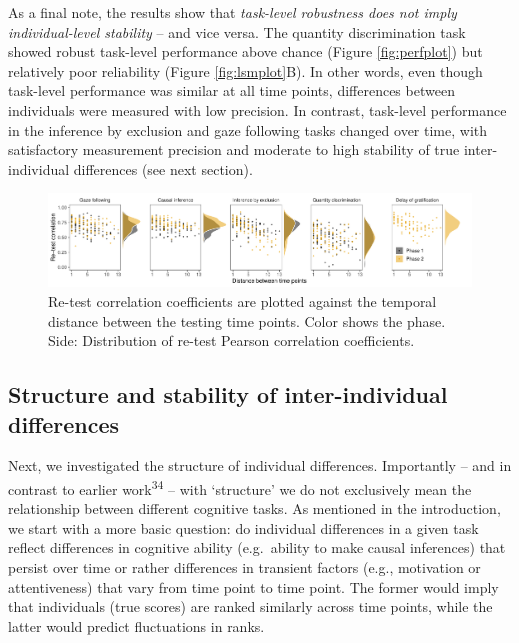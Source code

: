 \documentclass[
  man,floatsintext]{apa6}
\begin{document}
As a final note, the results show that \emph{task-level robustness does not imply individual-level stability} -- and vice versa. The quantity discrimination task showed robust task-level performance above chance (Figure \ref{fig:perfplot}) but relatively poor reliability (Figure \ref{fig:lsmplot}B). In other words, even though task-level performance was similar at all time points, differences between individuals were measured with low precision. In contrast, task-level performance in the inference by exclusion and gaze following tasks changed over time, with satisfactory measurement precision and moderate to high stability of true inter-individual differences (see next section).

\begin{figure}
\includegraphics[width=1\linewidth]{./figures/reliability2} \caption{Re-test correlation coefficients are plotted against the temporal distance between the testing time points. Color shows the phase. Side: Distribution of re-test Pearson correlation coefficients.}\label{fig:relplot}
\end{figure}

\hypertarget{structure-and-stability-of-inter-individual-differences}{%
\subsection{Structure and stability of inter-individual differences}\label{structure-and-stability-of-inter-individual-differences}}

Next, we investigated the structure of individual differences. Importantly -- and in contrast to earlier work\textsuperscript{34} -- with `structure' we do not exclusively mean the relationship between different cognitive tasks. As mentioned in the introduction, we start with a more basic question: do individual differences in a given task reflect differences in cognitive ability (e.g.~ability to make causal inferences) that persist over time or rather differences in transient factors (e.g., motivation or attentiveness) that vary from time point to time point. The former would imply that individuals (true scores) are ranked similarly across time points, while the latter would predict fluctuations in ranks.
\end{document}
